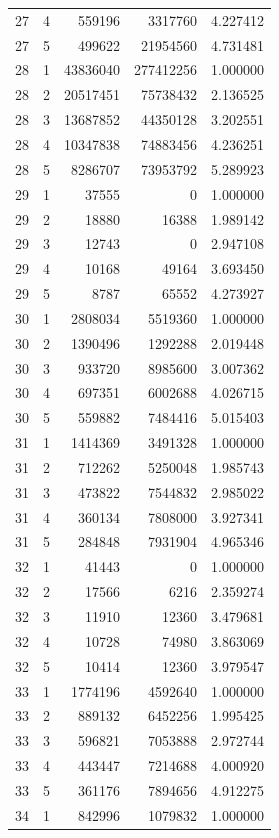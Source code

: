 \begin{longtable}{rrrrr}
27 & 4 & 559196 & 3317760 & 4.227412 \\
27 & 5 & 499622 & 21954560 & 4.731481 \\
28 & 1 & 43836040 & 277412256 & 1.000000 \\
28 & 2 & 20517451 & 75738432 & 2.136525 \\
28 & 3 & 13687852 & 44350128 & 3.202551 \\
28 & 4 & 10347838 & 74883456 & 4.236251 \\
28 & 5 & 8286707 & 73953792 & 5.289923 \\
29 & 1 & 37555 & 0 & 1.000000 \\
29 & 2 & 18880 & 16388 & 1.989142 \\
29 & 3 & 12743 & 0 & 2.947108 \\
29 & 4 & 10168 & 49164 & 3.693450 \\
29 & 5 & 8787 & 65552 & 4.273927 \\
30 & 1 & 2808034 & 5519360 & 1.000000 \\
30 & 2 & 1390496 & 1292288 & 2.019448 \\
30 & 3 & 933720 & 8985600 & 3.007362 \\
30 & 4 & 697351 & 6002688 & 4.026715 \\
30 & 5 & 559882 & 7484416 & 5.015403 \\
31 & 1 & 1414369 & 3491328 & 1.000000 \\
31 & 2 & 712262 & 5250048 & 1.985743 \\
31 & 3 & 473822 & 7544832 & 2.985022 \\
31 & 4 & 360134 & 7808000 & 3.927341 \\
31 & 5 & 284848 & 7931904 & 4.965346 \\
32 & 1 & 41443 & 0 & 1.000000 \\
32 & 2 & 17566 & 6216 & 2.359274 \\
32 & 3 & 11910 & 12360 & 3.479681 \\
32 & 4 & 10728 & 74980 & 3.863069 \\
32 & 5 & 10414 & 12360 & 3.979547 \\
33 & 1 & 1774196 & 4592640 & 1.000000 \\
33 & 2 & 889132 & 6452256 & 1.995425 \\
33 & 3 & 596821 & 7053888 & 2.972744 \\
33 & 4 & 443447 & 7214688 & 4.000920 \\
33 & 5 & 361176 & 7894656 & 4.912275 \\
34 & 1 & 842996 & 1079832 & 1.000000 \\

\end{longtable}
